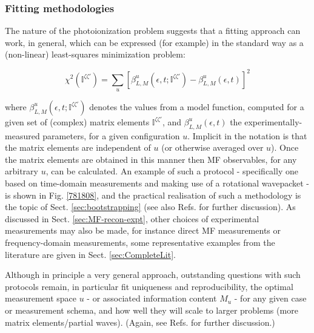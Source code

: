 \documentclass[10pt]{article}
\begin{document}
\subsubsection{Fitting methodologies\label{sec:fitting-intro}}

The nature of the photoionization problem suggests that a fitting approach can work, in general, which can be expressed (for example) in the standard way as a (non-linear) least-squares minimization problem:

\begin{equation}
\chi^{2}(\mathbb{I}^{\zeta\zeta'})=\sum_{u}\left[\beta^{u}_{L,M}(\epsilon,t;\mathbb{I}^{\zeta\zeta'})-\beta^{u}_{L,M}(\epsilon,t)\right]^{2}\label{eq:chi2-I}
\end{equation}

where $\beta^{u}_{L,M}(\epsilon,t;\mathbb{I}^{\zeta\zeta'})$ denotes  the values from a model function, computed for a given set of (complex) matrix elements $\mathbb{I}^{\zeta\zeta'}$, and $\beta^{u}_{L,M}(\epsilon,t)$ the experimentally-measured parameters, for a given configuration $u$. Implicit in the notation is that the matrix elements are independent of $u$ (or otherwise averaged over $u$). Once the matrix elements are obtained in this manner then MF observables, for any arbitrary $u$, can be calculated. An example of such a protocol - specifically one based on time-domain measurements and making use of a rotational wavepacket - is shown in Fig. \ref{781808}, %
and the practical realisation of such a methodology is the topic of Sect. \ref{sec:bootstrapping} (see also Refs. \cite{hockett2018QMP2,marceau2017MolecularFrameReconstruction} for further discussion). As discussed in Sect. \ref{sec:MF-recon-expt}, other choices of experimental measurements may also be made, for instance direct MF measurements or frequency-domain measurements, some representative examples from the literature are given in Sect. \ref{sec:CompleteLit}. 

Although in principle a very general approach, outstanding questions with such protocols remain, in particular fit uniqueness and reproducibility, the optimal measurement space $u$ - or associated information content $M_u$ - for any given case or measurement schema, and how well they will scale to larger problems (more matrix elements/partial waves). (Again, see Refs. \cite{hockett2018QMP2,marceau2017MolecularFrameReconstruction} for further discussion.)
\end{document}
